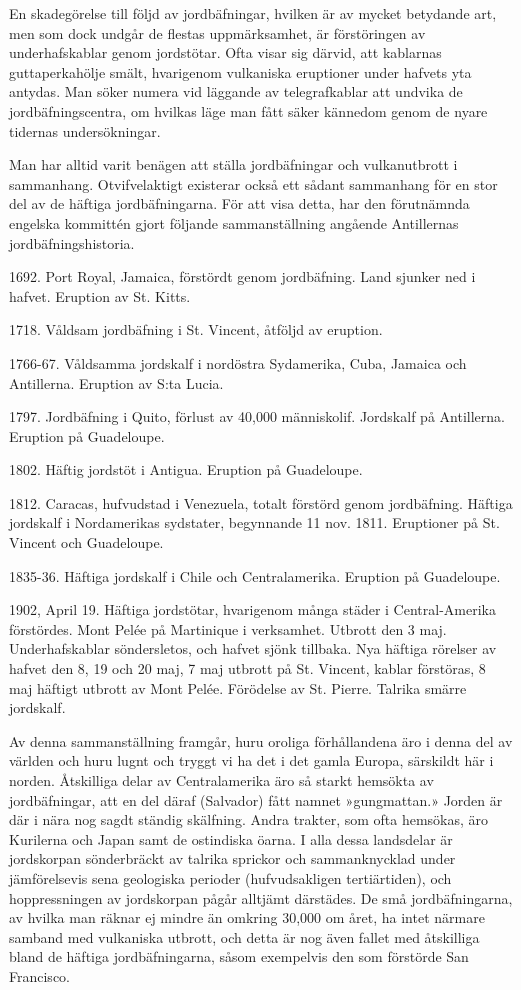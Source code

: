 \documentclass[a4paper, 12pt, oneside, swedish]{article}
\begin{document}
En skadegörelse till följd av jordbäfningar, hvilken är av mycket betydande art, men som dock undgår de flestas uppmärksamhet, är förstöringen av underhafskablar genom jordstötar. Ofta visar sig därvid, att kablarnas guttaperkahölje smält, hvarigenom vulkaniska eruptioner under hafvets yta antydas. Man söker numera vid läggande av telegrafkablar att undvika de jordbäfningscentra, om hvilkas läge man fått säker kännedom genom de nyare tidernas undersökningar.

Man har alltid varit benägen att ställa jordbäfningar och vulkanutbrott i sammanhang. Otvifvelaktigt existerar också ett sådant sammanhang för en stor del av de häftiga jordbäfningarna. För att visa detta, har den förutnämnda engelska kommittén gjort följande sammanställning angående Antillernas jordbäfningshistoria.

1692. Port Royal, Jamaica, förstördt genom jordbäfning. Land sjunker ned i hafvet. Eruption av St. Kitts.

1718. Våldsam jordbäfning i St. Vincent, åtföljd av eruption.

1766-67. Våldsamma jordskalf i nordöstra Sydamerika, Cuba, Jamaica och Antillerna. Eruption av S:ta Lucia.

1797. Jordbäfning i Quito, förlust av 40,000 människolif. Jordskalf på Antillerna. Eruption på Guadeloupe.

1802. Häftig jordstöt i Antigua. Eruption på Guadeloupe.

1812. Caracas, hufvudstad i Venezuela, totalt förstörd genom jordbäfning. Häftiga jordskalf i Nordamerikas sydstater, begynnande 11 nov. 1811. Eruptioner på St. Vincent och Guadeloupe.

1835-36. Häftiga jordskalf i Chile och Centralamerika. Eruption på Guadeloupe.

1902, April 19. Häftiga jordstötar, hvarigenom många städer i Central-Amerika förstördes. Mont Pelée på Martinique i verksamhet. Utbrott den 3 maj. Underhafskablar söndersletos, och hafvet sjönk tillbaka. Nya häftiga rörelser av hafvet den 8, 19 och 20 maj, 7 maj utbrott på St. Vincent, kablar förstöras, 8 maj häftigt utbrott av Mont Pelée. Förödelse av St. Pierre. Talrika smärre jordskalf.

Av denna sammanställning framgår, huru oroliga förhållandena äro i denna del av världen och huru lugnt och tryggt vi ha det i det gamla Europa, särskildt här i norden. Åtskilliga delar av Centralamerika äro så starkt hemsökta av jordbäfningar, att en del däraf (Salvador) fått namnet »gungmattan.» Jorden är där i nära nog sagdt ständig skälfning. Andra trakter, som ofta hemsökas, äro Kurilerna och Japan samt de ostindiska öarna. I alla dessa landsdelar är jordskorpan sönderbräckt av talrika sprickor och sammanknycklad under jämförelsevis sena geologiska perioder (hufvudsakligen tertiärtiden), och hoppressningen av jordskorpan pågår alltjämt därstädes. De små jordbäfningarna, av hvilka man räknar ej mindre än omkring 30,000 om året, ha intet närmare samband med vulkaniska utbrott, och detta är nog även fallet med åtskilliga bland de häftiga jordbäfningarna, såsom exempelvis den som förstörde San Francisco.
\end{document}
